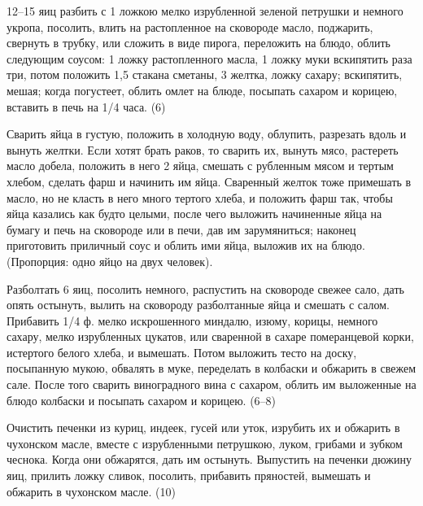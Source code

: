 
12--15 яиц разбить с 1 ложкою мелко изрубленной зеленой петрушки и немного укропа, посолить, влить на растопленное на сковороде масло, поджарить, свернуть в трубку, или сложить в виде пирога, переложить на блюдо, облить следующим соусом: 1 ложку растопленного масла, 1 ложку муки вскипятить раза три, потом положить 1,5 стакана сметаны, 3 желтка, ложку сахару; вскипятить, мешая; когда погустеет, облить омлет на блюде, посыпать сахаром и корицею, вставить в печь на 1/4 часа. (6) 


Сварить яйца в густую, положить в холодную воду, облупить, разрезать вдоль и вынуть желтки. Если хотят брать раков, то сварить их, вынуть мясо, растереть масло добела, положить в него 2 яйца, смешать с рубленным мясом и тертым хлебом, сделать фарш и начинить им яйца. Сваренный желток тоже примешать в масло, но не класть в него много тертого хлеба, и положить фарш так, чтобы яйца казались как будто целыми, после чего выложить начиненные яйца на бумагу и печь на сковороде или в печи, дав им зарумяниться; наконец приготовить приличный соус и облить ими яйца, выложив их на блюдо. (Пропорция: одно яйцо на двух человек). 


Разболтать 6 яиц, посолить немного, распустить на сковороде свежее сало, дать опять остынуть, вылить на сковороду разболтанные яйца и смешать с салом. Прибавить 1/4 ф. мелко искрошенного миндалю, изюму, корицы, немного сахару, мелко изрубленных цукатов, или сваренной в сахаре померанцевой корки, истертого белого хлеба, и вымешать. Потом выложить тесто на доску, посыпанную мукою, обвалять в муке, переделать в колбаски и обжарить в свежем сале. После того сварить виноградного вина с сахаром, облить им выложенные на блюдо колбаски и посыпать сахаром и корицею. (6--8) 


Очистить печенки из куриц, индеек, гусей или уток, изрубить их и обжарить в чухонском масле, вместе с изрубленными петрушкою, луком, грибами и зубком чеснока. Когда они обжарятся, дать им остынуть. Выпустить на печенки дюжину яиц, прилить ложку сливок, посолить, прибавить пряностей, вымешать и обжарить в чухонском масле. (10) 


